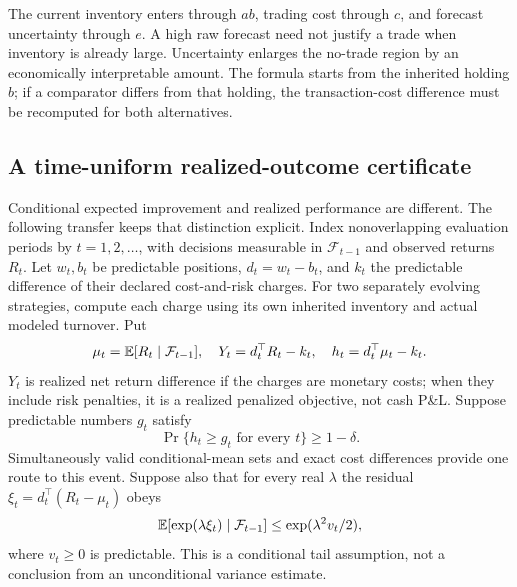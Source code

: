 The current inventory enters through $ab$, trading cost through $c$, and
forecast uncertainty through $e$. A high raw forecast need not justify a
trade when inventory is already large. Uncertainty enlarges the no-trade
region by an economically interpretable amount. The formula starts from
the inherited holding $b$; if a comparator differs from that holding, the
transaction-cost difference must be recomputed for both alternatives.

\subsection{A time-uniform realized-outcome certificate}

Conditional expected improvement and realized performance are different.
The following transfer keeps that distinction explicit. Index nonoverlapping
evaluation periods by $t=1,2,\ldots$, with decisions measurable in
$\mathcal F_{t-1}$ and observed returns $R_t$. Let $w_t,b_t$ be predictable
positions, $d_t=w_t-b_t$, and $k_t$ the predictable difference of their
declared cost-and-risk charges. For two separately evolving strategies,
compute each charge using its own inherited inventory and actual modeled
turnover. Put
\[
 \mu_t=\mathbb E[R_t\mid\mathcal F_{t-1}],\quad
 Y_t=d_t^\top R_t-k_t,\quad
 h_t=d_t^\top\mu_t-k_t.
\]
$Y_t$ is realized net return difference if the charges are monetary costs;
when they include risk penalties, it is a realized penalized objective,
not cash P\&L. Suppose predictable numbers $g_t$ satisfy
\begin{equation}\label{eq:coverageevent}
 \Pr\{h_t\ge g_t\text{ for every }t\}\ge1-\delta.
\end{equation}
Simultaneously valid conditional-mean sets and exact cost differences
provide one route to this event. Suppose also that for every real $\lambda$
the residual $\xi_t=d_t^\top(R_t-\mu_t)$ obeys
\begin{equation}\label{eq:predictablesubgaussian}
 \mathbb E[\exp(\lambda\xi_t)\mid\mathcal F_{t-1}]
       \le\exp(\lambda^2v_t/2),
\end{equation}
where $v_t\ge0$ is predictable. This is a conditional tail assumption,
not a conclusion from an unconditional variance estimate.

